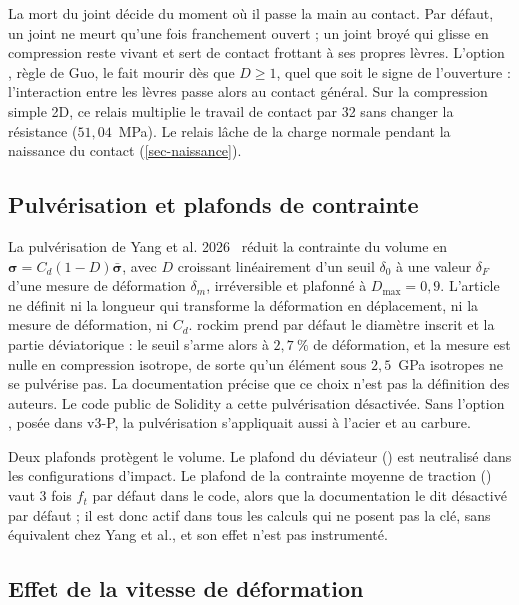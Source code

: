 La mort du joint décide du moment où il passe la main au contact. Par défaut, un joint ne meurt qu'une fois franchement ouvert ; un joint broyé qui glisse en compression reste vivant et sert de contact frottant à ses propres lèvres. L'option , règle de Guo, le fait mourir dès que $D \geq 1$, quel que soit le signe de l'ouverture : l'interaction entre les lèvres passe alors au contact général. Sur la compression simple 2D, ce relais multiplie le travail de contact par 32 sans changer la résistance ($51{,}04$~MPa). Le relais lâche de la charge normale pendant la naissance du contact (\cref{sec-naissance}).

\subsection{Pulvérisation et plafonds de contrainte}

La pulvérisation de Yang et al. 2026~\cite{yang2026pulverisation} réduit la contrainte du volume en $\boldsymbol\sigma = C_d(1 - D)\bar{\boldsymbol\sigma}$, avec $D$ croissant linéairement d'un seuil $\delta_0$ à une valeur $\delta_F$ d'une mesure de déformation $\delta_m$, irréversible et plafonné à $D_\text{max} = 0{,}9$. L'article ne définit ni la longueur qui transforme la déformation en déplacement, ni la mesure de déformation, ni $C_d$. rockim prend par défaut le diamètre inscrit et la partie déviatorique : le seuil s'arme alors à $2{,}7~\%$ de déformation, et la mesure est nulle en compression isotrope, de sorte qu'un élément sous $2{,}5$~GPa isotropes ne se pulvérise pas. La documentation précise que ce choix n'est pas la définition des auteurs. Le code public de Solidity a cette pulvérisation désactivée. Sans l'option , posée dans v3-P, la pulvérisation s'appliquait aussi à l'acier et au carbure.

Deux plafonds protègent le volume. Le plafond du déviateur () est neutralisé dans les configurations d'impact. Le plafond de la contrainte moyenne de traction () vaut 3 fois $f_t$ par défaut dans le code, alors que la documentation le dit désactivé par défaut ; il est donc actif dans tous les calculs qui ne posent pas la clé, sans équivalent chez Yang et al., et son effet n'est pas instrumenté.

\subsection{Effet de la vitesse de déformation}

